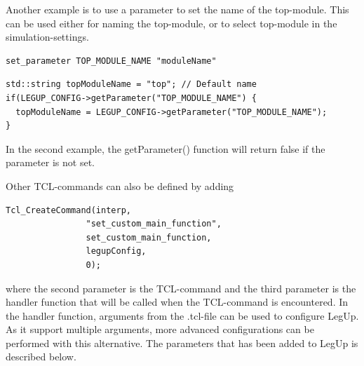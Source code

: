 Another example is to use a parameter to set the name of the top-module. This can be used either for naming the top-module, or to select top-module in the simulation-settings. 
\begin{verbatim}
set_parameter TOP_MODULE_NAME "moduleName"
\end{verbatim}
\begin{lstlisting}
std::string topModuleName = "top"; // Default name
if(LEGUP_CONFIG->getParameter("TOP_MODULE_NAME") {
  topModuleName = LEGUP_CONFIG->getParameter("TOP_MODULE_NAME");
}
\end{lstlisting}
In the second example, the getParameter() function will return false if the parameter is not set.

Other TCL-commands can also be defined by adding 
\begin{lstlisting}
Tcl_CreateCommand(interp,
                "set_custom_main_function",
                set_custom_main_function,
                legupConfig,
                0);
\end{lstlisting}
where the second parameter is the TCL-command and the third parameter is the handler function that will be called when the TCL-command is encountered. In the handler function, arguments from the .tcl-file can be used to configure LegUp. As it support multiple arguments, more advanced configurations can be performed with this alternative. The parameters that has been added to LegUp is described below.

